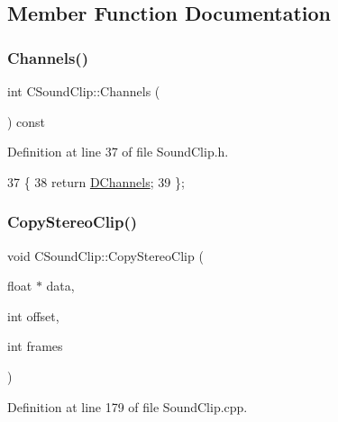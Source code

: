 \subsection{Member Function Documentation}
\hypertarget{classCSoundClip_acd59c59e307ae3e251a9b40c752fe467}{}\label{classCSoundClip_acd59c59e307ae3e251a9b40c752fe467} 
\subsubsection{\texorpdfstring{Channels()}{Channels()}}
{\footnotesize\ttfamily int C\+Sound\+Clip\+::\+Channels (\begin{DoxyParamCaption}{ }\end{DoxyParamCaption}) const\hspace{0.3cm}{\ttfamily [inline]}}



Definition at line 37 of file Sound\+Clip.\+h.


\begin{DoxyCode}
37                             \{
38             \textcolor{keywordflow}{return} \hyperlink{classCSoundClip_a01aaf0b87b9b8226c77a6931d03d6a64}{DChannels};  
39         \};
\end{DoxyCode}
\hypertarget{classCSoundClip_a9cc8dd683c638331b2d0532aa68149da}{}\label{classCSoundClip_a9cc8dd683c638331b2d0532aa68149da} 
\subsubsection{\texorpdfstring{Copy\+Stereo\+Clip()}{CopyStereoClip()}}
{\footnotesize\ttfamily void C\+Sound\+Clip\+::\+Copy\+Stereo\+Clip (\begin{DoxyParamCaption}\item[{float $\ast$}]{data,  }\item[{int}]{offset,  }\item[{int}]{frames }\end{DoxyParamCaption})}



Definition at line 179 of file Sound\+Clip.\+cpp.


